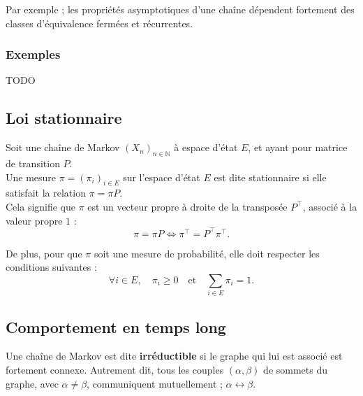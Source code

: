 \documentclass{article}
\begin{document}
Par exemple ; les propriétés asymptotiques d'une chaîne dépendent fortement des classes d'équivalence fermées et récurrentes. %

\subsubsection{Exemples}

TODO \\



\subsection{Loi stationnaire}

Soit une chaîne de Markov $(X_n)_{n \in \mathbb{N}}$ à espace d'état $E$, et ayant pour matrice de transition $P$. \\

Une mesure $\pi = (\pi_i)_{i \in E}$ sur l'espace d'état $E$ est dite stationnaire si elle satisfait la relation $\pi = \pi P$. \\

Cela signifie que $\pi$ est un vecteur propre à droite de la transposée $P^{\top}$, associé à la valeur propre $1$ :
\[
\pi = \pi P \iff \pi^{\top} = P^{\top} \pi^{\top}.
\]

De plus, pour que $\pi$ soit une mesure de probabilité, elle doit respecter les conditions suivantes :
\[
\forall i \in E, \quad \pi_i \geq 0 \quad \text{et} \quad \sum_{i \in E} \pi_i = 1.
\]

\subsection{Comportement en temps long}

Une chaîne de Markov est dite \textbf{irréductible} si le graphe qui lui est associé est fortement connexe. %
Autrement dit, tous les couples $(\alpha, \beta)$ de sommets du graphe, avec $\alpha \neq \beta$, communiquent mutuellement ; $\alpha \leftrightarrow \beta$. \\
\end{document}
